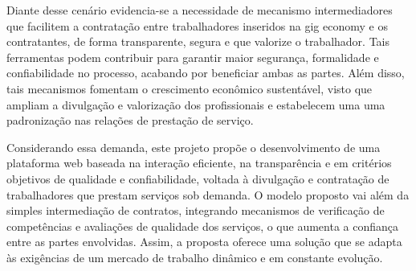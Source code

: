 Diante desse cenário evidencia-se a necessidade de mecanismo intermediadores que facilitem a contratação entre trabalhadores inseridos na gig economy e os contratantes, de forma transparente, segura e que valorize o trabalhador. Tais ferramentas podem contribuir para garantir maior segurança, formalidade e confiabilidade no processo, acabando por beneficiar ambas as partes. Além disso, tais mecanismos fomentam o crescimento econômico sustentável, visto que ampliam a divulgação e valorização dos profissionais e estabelecem uma uma padronização nas relações de prestação de serviço.  

Considerando essa demanda, este projeto propõe o desenvolvimento de uma plataforma web baseada na interação eficiente, na transparência e em critérios objetivos de qualidade e confiabilidade, voltada à divulgação e contratação de trabalhadores que prestam serviços sob demanda.  O modelo proposto vai além da simples intermediação de contratos, integrando mecanismos de verificação de competências e avaliações de qualidade dos serviços, o que aumenta a confiança entre as partes envolvidas. Assim, a proposta oferece uma solução que se adapta às exigências de um mercado de trabalho dinâmico e em constante evolução.